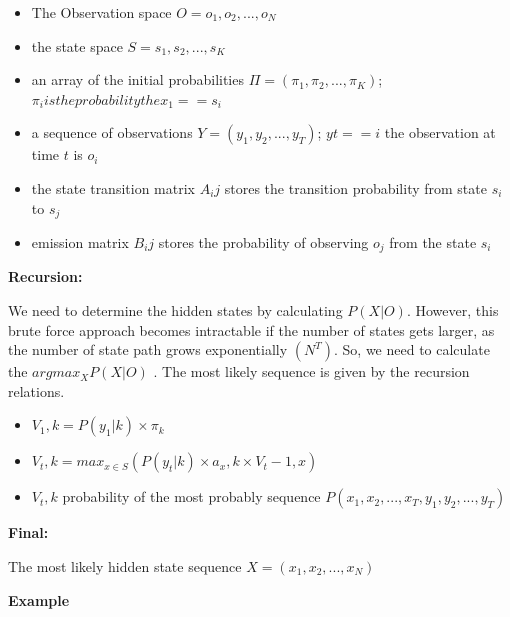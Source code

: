 \begin{itemize}


\item The Observation space $O =  {o_1,o_2,...,o_N}$

\item the state space $S = {s_1,s_2,...,s_K}$

\item an array of the initial probabilities $\Pi = (\pi_1, \pi_2,...,\pi_K)$; $\pi_i is the probability the x_1 == s_i$

\item a sequence of observations $Y = (y_1,y_2,...,y_T)$; $yt == i$ the observation at time $t$ is $o_i$

\item the state transition matrix $A_ij$ stores the transition probability from state $s_i$ to $s_j$


\item emission matrix $B_ij$ stores the probability of observing $o_j$ from the state $s_i$
\end{itemize}  

\textbf{Recursion:}

We need to determine the hidden states by calculating $P(X|O)$. However, this brute force approach becomes intractable if the number of states gets larger, as the number of state path grows exponentially $(N^T)$. So, we need to calculate the $argmax_X P(X|O)$ . The most likely sequence is given by the recursion relations.

\begin{center}

\begin{itemize}


\item $V_1,k = P (y_1|k) \times \pi_k$

\item $V_t,k = max_{x \in S} (P (y_t|k) \times a_x,k \times V_t-1,x)$

\item $V_t,k$ probability of the most probably sequence $P (x_1, x_2,...,x_T, y_1,y_2,...,y_T)$

\end{itemize}

\end{center}


\textbf{Final:}

The most likely hidden state sequence $X = (x_1,x_2,...,x_N)$ 

\textbf{Example}



